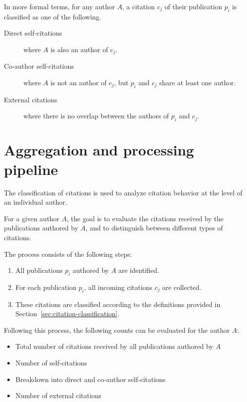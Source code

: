In more formal terms, for any author $A$, a citation $c_j$ of their publication $p_i$ is classified as one of the following.

\begin{description}
    \item
    [Direct self-citations] where $A$ is also an author of $c_j$.
    \item
    [Co-author self-citations] where $A$ is not an author of $c_j$, but $p_i$ and $c_j$ share at least one author.
    \item
    [External citations] where there is no overlap between the authors of $p_i$ and $c_j$.
\end{description}

\section{Aggregation and processing pipeline} \label{sec:aggregation-pipeline}

The classification of citations is used to analyze citation behavior at the level of an individual author.

For a given author $A$, the goal is to evaluate the citations received by the publications authored by $A$, and to distinguish between different types of citations.

The process consists of the following steps:

\begin{enumerate}
    \item All publications $p_i$ authored by $A$ are identified.
    \item For each publication $p_i$, all incoming citations $c_j$ are collected.
    \item These citations are classified according to the definitions provided in Section~\ref{sec:citation-classification}.
\end{enumerate}

Following this process, the following counts can be evaluated for the author $A$:

\begin{itemize}
    \item Total number of citations received by all publications authored by $A$
    \item Number of self-citations
    \item Breakdown into direct and co-author self-citations
    \item Number of external citations
\end{itemize}

